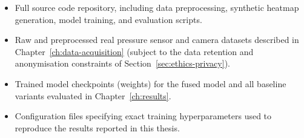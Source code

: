 \begin{itemize}
    \item Full source code repository, including data preprocessing,
    synthetic heatmap generation, model training, and evaluation scripts.
    \item Raw and preprocessed real pressure sensor and camera datasets
    described in Chapter~\ref{ch:data-acquisition} (subject to the data
    retention and anonymisation constraints of Section~\ref{sec:ethics-privacy}).
    \item Trained model checkpoints (weights) for the fused model and all
    baseline variants evaluated in Chapter~\ref{ch:results}.
    \item Configuration files specifying exact training hyperparameters
    used to reproduce the results reported in this thesis.
\end{itemize}
